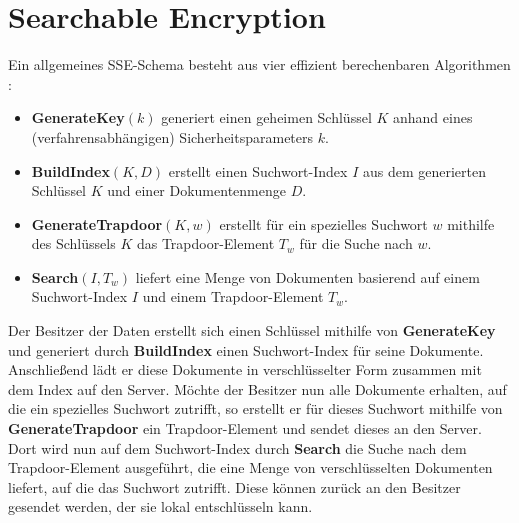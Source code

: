 \section{Searchable Encryption}

\label{sec_basisc_se}





Ein allgemeines SSE-Schema besteht aus vier effizient berechenbaren Algorithmen \cite{wang2016}:

\begin{itemize}
  \item \textbf{GenerateKey}\((k)\) generiert einen geheimen Schlüssel \(K\) anhand eines (verfahrensabhängigen) Sicherheitsparameters \(k\).
  \item \textbf{BuildIndex}\((K, D)\) erstellt einen Suchwort-Index \(I\) aus dem generierten Schlüssel \(K\) und einer Dokumentenmenge \(D\).
  \item \textbf{GenerateTrapdoor}\((K, w)\) erstellt für ein spezielles Suchwort \(w\) mithilfe des Schlüssels \(K\) das Trapdoor-Element \(T_w\) für die Suche nach \(w\).
  \item \textbf{Search}\((I, T_w)\) liefert eine Menge von Dokumenten basierend auf einem Suchwort-Index \(I\) und einem Trapdoor-Element \(T_w\).
\end{itemize}

Der Besitzer der Daten erstellt sich einen Schlüssel mithilfe von \textbf{GenerateKey} und generiert durch \textbf{BuildIndex} einen Suchwort-Index für seine Dokumente. Anschließend lädt er diese Dokumente in verschlüsselter Form zusammen mit dem Index auf den Server. Möchte der Besitzer nun alle Dokumente erhalten, auf die ein spezielles Suchwort zutrifft, so erstellt er für dieses Suchwort mithilfe von \textbf{GenerateTrapdoor} ein Trapdoor-Element und sendet dieses an den Server. Dort wird nun auf dem Suchwort-Index durch \textbf{Search} die Suche nach dem Trapdoor-Element ausgeführt, die eine Menge von verschlüsselten Dokumenten liefert, auf die das Suchwort zutrifft. Diese können zurück an den Besitzer gesendet werden, der sie lokal entschlüsseln kann. 